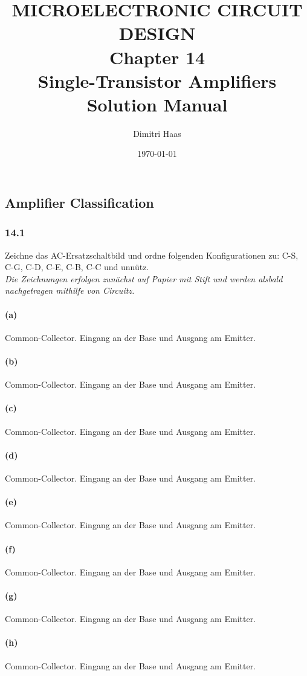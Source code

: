 \documentclass[11pt,a4paper,titlepage]{article}
\title{\blue MICROELECTRONIC CIRCUIT DESIGN \\	\blueb Chapter 14 \\ Single-Transistor Amplifiers \\ Solution Manual}
\author{Dimitri Haas}
\date{\today}
\begin{document}
\maketitle
\setcounter{section}{14}
\subsection{Amplifier Classification}
\subsubsection*{14.1}
Zeichne das AC-Ersatzschaltbild und ordne folgenden Konfigurationen zu: C-S, C-G, C-D, C-E, C-B, C-C und unnütz.\\
\textit{Die Zeichnungen erfolgen zunächst auf Papier mit Stift und werden alsbald nachgetragen mithilfe von Circuitz.}
\paragraph{(a)} Common-Collector. Eingang an der Base und Ausgang am Emitter.
\paragraph{(b)} Common-Collector. Eingang an der Base und Ausgang am Emitter.
\paragraph{(c)} Common-Collector. Eingang an der Base und Ausgang am Emitter.
\paragraph{(d)} Common-Collector. Eingang an der Base und Ausgang am Emitter.
\paragraph{(e)} Common-Collector. Eingang an der Base und Ausgang am Emitter.
\paragraph{(f)} Common-Collector. Eingang an der Base und Ausgang am Emitter.
\paragraph{(g)} Common-Collector. Eingang an der Base und Ausgang am Emitter.
\paragraph{(h)} Common-Collector. Eingang an der Base und Ausgang am Emitter.
\end{document}
